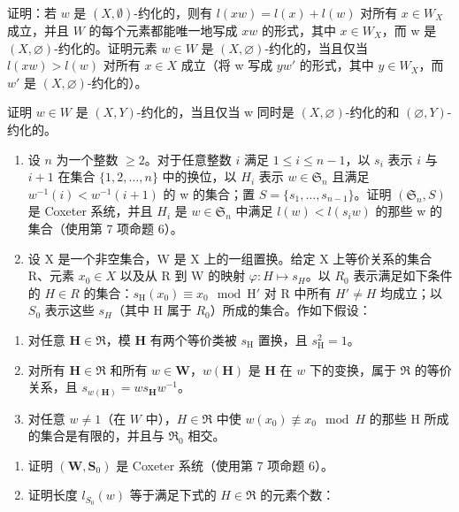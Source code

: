 证明：若 \(w\) 是 \((X, \emptyset)\)-约化的，则有 \(l(xw) = l(x) + l(w)\) 对所有 \(x \in W_X\) 成立，并且 \(W\) 的每个元素都能唯一地写成 \(xw\) 的形式，其中 \(x \in W_{X}\)，而 w 是 \((X, \varnothing)\)-约化的。证明元素 \(w \in W\) 是 \((X, \varnothing)\)-约化的，当且仅当 \(l(xw) > l(w)\) 对所有 \(x \in X\) 成立（将 w 写成 \(yw'\) 的形式，其中 \(y \in W_{X}\)，而 \(w'\) 是 \((X, \varnothing)\)-约化的）。

证明 \(w \in W\) 是 \((X, Y)\)-约化的，当且仅当 w 同时是 \((X, \varnothing)\)-约化的和 \((\varnothing, Y)\)-约化的。

\begin{enumerate}
\def\labelenumi{\arabic{enumi})}
\setcounter{enumi}{3}
\item
  设 \(n\) 为一个整数 \(\geqslant 2\)。对于任意整数 \(i\) 满足 \(1 \leqslant i \leqslant n - 1\)，以 \(s_i\) 表示 \(i\) 与 \(i + 1\) 在集合 \(\{1, 2, \ldots, n\}\) 中的换位，以 \(H_i\) 表示 \(w \in \mathfrak{S}_n\) 且满足 \(w^{-1}(i) < w^{-1}(i + 1)\) 的 w 的集合；置 \(S = \{s_1, \ldots, s_{n-1}\}\)。证明 \((\mathfrak{S}_n, S)\) 是 Coxeter 系统，并且 \(H_i\) 是 \(w \in \mathfrak{S}_n\) 中满足 \(l(w) < l(s_i w)\) 的那些 w 的集合（使用第 7 项命题 6）。
\item
  设 X 是一个非空集合，W 是 X 上的一组置换。给定 X 上等价关系的集合 R、元素 \(x_{0} \in X\) 以及从 R 到 W 的映射 \(\varphi : H \mapsto s_{H}\)。以 \(R_{0}\) 表示满足如下条件的 \(H \in R\) 的集合：\(s_{\mathrm{H}}(x_{0}) \equiv x_{0} \mod \mathrm{H}'\) 对 R 中所有 \(H' \neq H\) 均成立；以 \(S_{0}\) 表示这些 \(s_{H}\)（其中 H 属于 \(R_{0}\)）所成的集合。作如下假设：
\end{enumerate}

\begin{enumerate}
\def\labelenumi{(\roman{enumi})}
\item
  对任意 \(\mathbf{H} \in \Re\)，模 \(\mathbf{H}\) 有两个等价类被 \(s_{\mathrm{H}}\) 置换，且 \(s_{\mathrm{H}}^{2} = 1\)。
\item
  对所有 \(\mathbf{H} \in \Re\) 和所有 \(w \in \mathbf{W}\)，\(w(\mathbf{H})\) 是 \(\mathbf{H}\) 在 \(w\) 下的变换，属于 \(\Re\) 的等价关系，且 \(s_{w(\mathbf{H})} = ws_{\mathbf{H}}w^{-1}\)。
\item
  对任意 \(w \neq 1\)（在 \(W\) 中），\(H \in \Re\) 中使 \(w(x_0) \not\equiv x_0 \mod H\) 的那些 H 所成的集合是有限的，并且与 \(\Re_0\) 相交。
\end{enumerate}

\begin{enumerate}
\def\labelenumi{\alph{enumi})}
\item
  证明 \((\mathbf{W},\mathbf{S}_0)\) 是 Coxeter 系统（使用第 7 项命题 6）。
\item
  证明长度 \(l_{S_0}(w)\) 等于满足下式的 \(H \in \mathfrak{R}\) 的元素个数：
\end{enumerate}

